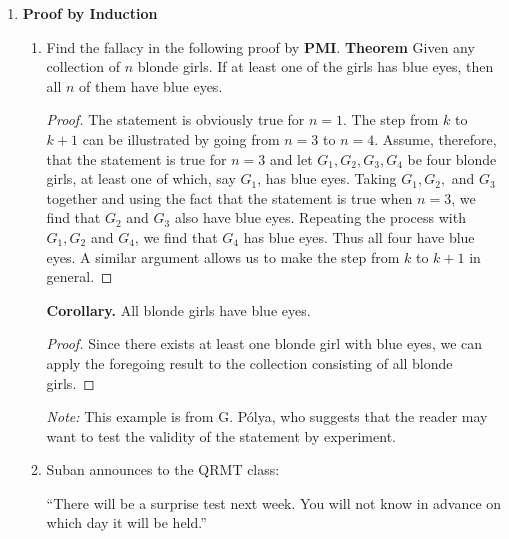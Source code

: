 \begin{enumerate}
\item \textbf{Proof by Induction}
\begin{enumerate}

      \item  Find the fallacy in the following proof by {\bf PMI}. \newline
        {\bf Theorem}
        Given any collection of $n$ blonde girls. If at least one of the 
        girls has blue eyes, then all $n$ of them have blue eyes. \newline
        \begin{proof}
        The statement is obviously true for $n = 1$. The step from $k$ to
        $k+1$ can be illustrated by going from $n = 3$ to $n = 4$. Assume,
        therefore, that the statement is true for $n = 3$ and let
        $G_1,G_2,G_3,G_4$ be four blonde girls, at least one of which,
        say $G_1$, has blue eyes.  Taking $G_1,G_2,$ and $G_3$ together
        and using the fact that the statement is true when $n = 3$, we find
        that $G_2$ and $G_3$ also have blue eyes. Repeating the process
        with $G_1,G_2$ and $G_4$, we find that $G_4$ has blue eyes. Thus
        all four have blue eyes. A similar argument allows us to make
        the step from $k$ to $k+1$ in general.
        \end{proof} \newline
        {\bf Corollary.} All blonde girls have blue eyes. \newline
        \begin{proof}
        Since there exists at least one blonde girl with blue eyes, we
        can apply the foregoing result to the collection consisting
        of all blonde girls.
        \end{proof}  \newline
        {\em Note:} This example is from G. P\'{o}lya, who suggests that the reader may want to test the validity of the statement by experiment.
        
        \item Suban announces to the QRMT class:

               ``There will be a surprise test next week. You will not know in advance on which day it will be held.''


\end{enumerate}
\end{enumerate}
